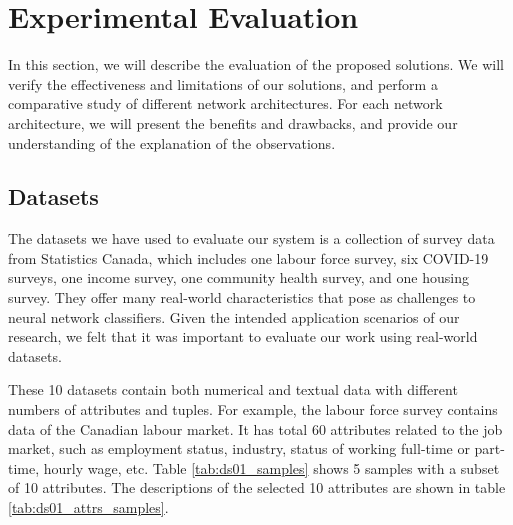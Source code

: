 \documentclass[conference]{IEEEtran}
\begin{document}
\section{Experimental Evaluation}

In this section, we will describe the evaluation of the proposed solutions.  We will verify the effectiveness and limitations of our solutions, and perform a comparative study of different network architectures.  For each network architecture, we will present the benefits and drawbacks, and provide our understanding of the explanation of the observations.

\subsection{Datasets}
The datasets we have used to evaluate our system is a collection of survey data from Statistics Canada, which includes one labour force survey, six COVID-19 surveys, one income survey, one community health survey, and one housing survey.
They offer many real-world characteristics that pose as challenges to  neural network classifiers.  Given the intended application scenarios of our research, we felt that it was important to evaluate our work using real-world datasets. 


These 10 datasets contain both numerical and textual data with different numbers of attributes and tuples. For example, the labour force survey contains data of the Canadian labour market. It has total 60 attributes related to the job market, such as employment status, industry, status of working full-time or part-time, hourly wage, etc. Table \ref{tab:ds01_samples} shows 5 samples with a subset of 10 attributes. The descriptions of the selected 10 attributes are shown in table \ref{tab:ds01_attrs_samples}.
\end{document}
